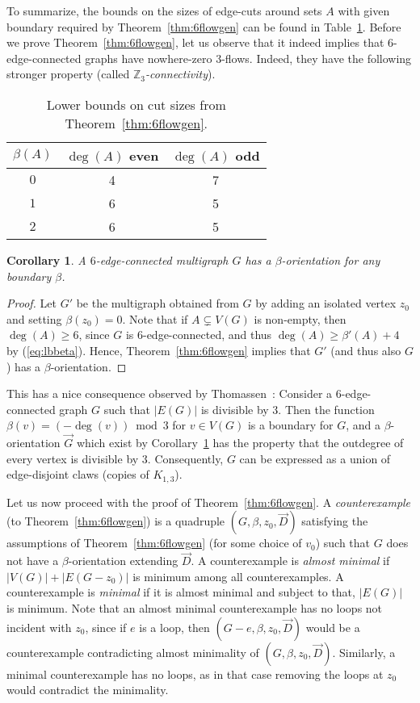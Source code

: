 \documentclass[12pt,twoside,openright,a4paper]{book}
\newtheorem{corollary}[theorem]{Corollary}
\begin{document}
To summarize, the bounds on the sizes of edge-cuts around sets $A$ with given boundary required by Theorem~\ref{thm:6flowgen} can be found in Table~\ref{tab:6flowgen}.
Before we prove Theorem~\ref{thm:6flowgen}, let us observe that it indeed implies that $6$-edge-connected graphs have nowhere-zero $3$-flows.
Indeed, they have the following stronger property (called \emph{$\mathbb{Z}_3$-connectivity}).
\begin{table}
\begin{center}
\begin{tabular}{c|cc}
$\beta(A)$&$\deg(A)$ even&$\deg(A)$ odd\\
\hline
$0$&4&7\\
$1$&6&5\\
$2$&6&5
\end{tabular}
\end{center}
\caption{Lower bounds on cut sizes from Theorem~\ref{thm:6flowgen}.}\label{tab:6flowgen}
\end{table}

\begin{corollary}\label{cor:z3conn}
A $6$-edge-connected multigraph $G$ has a $\beta$-orientation for any boundary $\beta$.
\end{corollary}
\begin{proof}
Let $G'$ be the multigraph obtained from $G$ by adding an isolated vertex $z_0$ and setting $\beta(z_0)=0$.
Note that if $A\subsetneq V(G)$ is non-empty, then $\deg(A)\ge 6$, since $G$ is $6$-edge-connected, and thus
$\deg(A)\ge \beta'(A)+4$ by (\ref{eq:lbbeta}).  Hence, Theorem~\ref{thm:6flowgen} implies that $G'$ (and thus also $G$)
has a $\beta$-orientation.
\end{proof}
This has a nice consequence observed by Thomassen~\cite{weak83}: Consider a $6$-edge-connected graph $G$ such that $|E(G)|$ is
divisible by $3$.  Then the function $\beta(v)=(-\deg(v))\bmod 3$ for $v\in V(G)$ is a boundary for $G$, and a $\beta$-orientation $\vec{G}$
which exist by Corollary~\ref{cor:z3conn} has the property that the outdegree of every vertex is divisible by $3$.
Consequently, $G$ can be expressed as a union of edge-disjoint claws (copies of $K_{1,3}$).

Let us now proceed with the proof of Theorem~\ref{thm:6flowgen}.  A \emph{counterexample} (to Theorem~\ref{thm:6flowgen}) is a quadruple $(G,\beta,z_0,\vec{D})$
satisfying the assumptions of Theorem~\ref{thm:6flowgen} (for some choice of $v_0$) such that $G$ does not have a $\beta$-orientation extending $\vec{D}$.
A counterexample is \emph{almost minimal} if $|V(G)|+|E(G-z_0)|$ is minimum among all counterexamples.
A counterexample is \emph{minimal} if it is almost minimal and subject to that, $|E(G)|$ is minimum.
Note that an almost minimal counterexample has no loops not incident with $z_0$, since if $e$ is a loop, then $(G-e,\beta,z_0, \vec{D})$ would be a counterexample
contradicting almost minimality of $(G,\beta,z_0,\vec{D})$.
Similarly, a minimal counterexample has no loops, as in that case removing the loops at $z_0$ would contradict the minimality.
\end{document}

